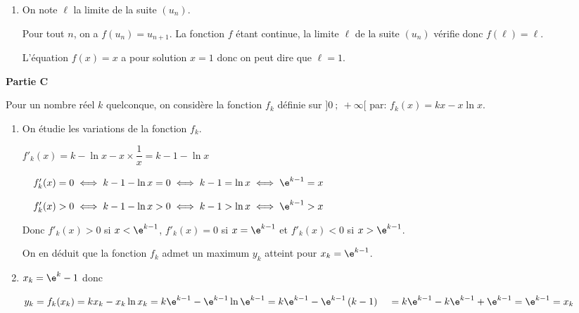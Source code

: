 \begin{enumerate}
\begin{enumerate}
D'après le théorème de la convergence monotone, on peut en déduire que la suite $(u_n)$ est convergente.
		
		
		\item On note $\ell$ la limite de la suite $\left(u_n\right)$. %
		
Pour tout $n$, on a $f(u_n)= u_{n+1}$. La fonction $f$ étant continue, la limite $\ell$ de la suite $(u_n)$ vérifie donc $f(\ell) = \ell$.

L'équation $f(x)=x$ a pour solution $x=1$ donc on peut dire que $\ell=1$.
		
	\end{enumerate}
\end{enumerate}

\bigskip

\textbf{Partie C}

\medskip

Pour un nombre réel $k$ quelconque, on considère la fonction $f_k$ définie sur $]0~;~+\infty[$ par:
$f_k(x) = kx - x \ln x.$

\begin{enumerate}
\item %

On étudie les variations de la fonction $f_k$.

$f'_k(x)=k - \ln x - x\times \dfrac{1}{x}= k-1 -\ln x$

\textbullet~~$f'_k(x) = 0 \iff k-1-\ln x = 0 \iff k-1 = \ln x \iff \e^{k-1}=x$

\textbullet~~$f'_k(x) > 0 \iff k-1-\ln x > 0 \iff k-1 > \ln x \iff \e^{k-1}>x$

Donc $f'_k(x)>0$ si $x<\e^{k-1}$, $f'_k(x)=0$ si $x=\e^{k-1}$ et $f'_k(x)<0$ si $x>\e^{k-1}$.

On en déduit que la fonction $f_k$ admet un maximum $y_k$ atteint pour $x_k=\e^{k-1}$.

\item  %
$x_k = \e^k- 1$ donc 

$y_k=f_k(x_k) = kx_k - x_k \ln x_k
=k \e^{k- 1} -  \e^{k- 1}\ln \e^{k- 1}
= k\e^{k-1} - \e^{k- 1}\left (k-1\right )\\
\phantom{y_k}
=  k\e^{k-1} -  k\e^{k-1} +  \e^{k-1}
=\e^{k-1}
=x_k
$


\end{enumerate}

\bigskip

